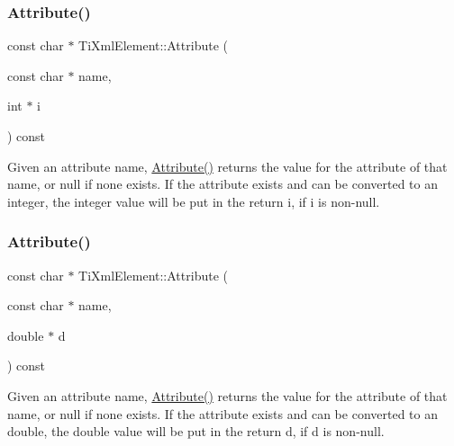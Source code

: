 \subsubsection{\texorpdfstring{Attribute()}{Attribute()}\hspace{0.1cm}{\footnotesize\ttfamily [2/3]}}
{\footnotesize\ttfamily const char $\ast$ Ti\+Xml\+Element\+::\+Attribute (\begin{DoxyParamCaption}\item[{const char $\ast$}]{name,  }\item[{int $\ast$}]{i }\end{DoxyParamCaption}) const}

Given an attribute name, \hyperlink{class_ti_xml_element_a6042f518748f475a7ac4b4e0b509eb05}{Attribute()} returns the value for the attribute of that name, or null if none exists. If the attribute exists and can be converted to an integer, the integer value will be put in the return \textquotesingle{}i\textquotesingle{}, if \textquotesingle{}i\textquotesingle{} is non-\/null. \mbox{\label{class_ti_xml_element_a09df893402d0ab1402c8725e6d30ec04}} 
\subsubsection{\texorpdfstring{Attribute()}{Attribute()}\hspace{0.1cm}{\footnotesize\ttfamily [3/3]}}
{\footnotesize\ttfamily const char $\ast$ Ti\+Xml\+Element\+::\+Attribute (\begin{DoxyParamCaption}\item[{const char $\ast$}]{name,  }\item[{double $\ast$}]{d }\end{DoxyParamCaption}) const}

Given an attribute name, \hyperlink{class_ti_xml_element_a6042f518748f475a7ac4b4e0b509eb05}{Attribute()} returns the value for the attribute of that name, or null if none exists. If the attribute exists and can be converted to an double, the double value will be put in the return \textquotesingle{}d\textquotesingle{}, if \textquotesingle{}d\textquotesingle{} is non-\/null. \mbox{\label{class_ti_xml_element_af0f814ecbd43d50d4cdbdf4354d3da39}} 
